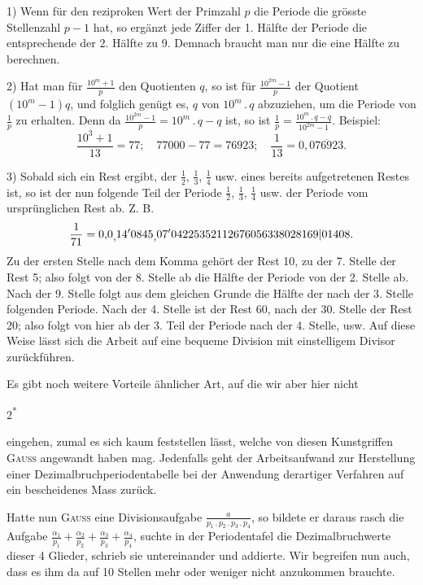 1) Wenn für den reziproken Wert der Primzahl $p$ die Periode die grösste
Stellenzahl $p-1$ hat, so ergänzt jede Ziffer der 1. Hälfte der Periode die
entsprechende der 2. Hälfte zu 9. Demnach braucht man nur die eine Hälfte
zu berechnen.

2) Hat man für $\frac{10^m+1}{p}$ den Quotienten $q$, so ist für $\frac{10^{2m}-1}{p}$ der Quotient
$(10^m-1)q$, und folglich genügt es, $q$ von $10^m\mathpunct{.}q$ abzuziehen, um die Periode
von $\frac{1}{p}$ zu erhalten. Denn da $\frac{10^{2m}-1}{p}=10^m\mathpunct{.}q-q$ ist, so ist $\frac{1}{p}=\frac{10^m\mathpunct{.}q-q}{10^{2m}-1}$.
Beispiel:
\[
\frac{10^3+1}{13}=77;\quad 77000-77=76923;\quad \frac{1}{13}=0{,}\overline{076923}.
\]
\par\noindent\hspace*{\parindent}3) Sobald sich ein Rest ergibt, der $\frac{1}{2}$, $\frac{1}{3}$, $\frac{1}{4}$ usw. eines bereits aufgetretenen
Restes ist, so ist der nun folgende Teil der Periode $\frac{1}{2}$, $\frac{1}{3}$, $\frac{1}{4}$ usw. der Periode
vom ursprünglichen Rest ab. Z. B.
\[
\frac{1}{71}=0{,}0\MLowComma14^{\prime}0845\MLowComma07^{\prime}04225352112676056338028169\vert01408.
\]
\noindent Zu der ersten Stelle nach dem Komma gehört der Rest 10, zu der 7. Stelle
der Rest 5; also folgt von der 8. Stelle ab die Hälfte der Periode von der
2. Stelle ab. Nach der 9. Stelle folgt aus dem gleichen Grunde die Hälfte
der nach der 3. Stelle folgenden Periode. Nach der 4. Stelle ist der Rest
60, nach der 30. Stelle der Rest 20; also folgt von hier ab der 3. Teil der
Periode nach der 4. Stelle, usw. Auf diese Weise lässt sich die Arbeit auf
eine bequeme Division mit einstelligem Divisor zurückführen.

Es gibt noch weitere Vorteile ähnlicher Art, auf die wir aber hier nicht
\par\smallskip\noindent\hfill{\small 2\textsuperscript{*}}\par
\clearpage{}
\setcounter{footnote}{0}
\noindent eingehen, zumal es sich kaum feststellen lässt, welche von diesen Kunstgriffen
\textsc{Gauss} angewandt haben mag. Jedenfalls geht der Arbeitsaufwand zur Herstellung einer Dezimalbruchperiodentabelle bei der Anwendung derartiger Verfahren auf ein bescheidenes Mass zurück.

Hatte nun \textsc{Gauss} eine Divisionsaufgabe $\frac{a}{p_1\mathpunct{.}p_2\mathpunct{.}p_3\mathpunct{.}p_4}$, so bildete er daraus
rasch die Aufgabe $\frac{\alpha_1}{p_1}+\frac{\alpha_2}{p_2}+\frac{\alpha_3}{p_3}+\frac{\alpha_4}{p_4}$, suchte in der Periodentafel die Dezimalbruchwerte dieser 4 Glieder, schrieb sie untereinander und addierte. Wir begreifen nun auch, dass es ihm da auf 10 Stellen mehr oder weniger nicht
anzukommen brauchte.

